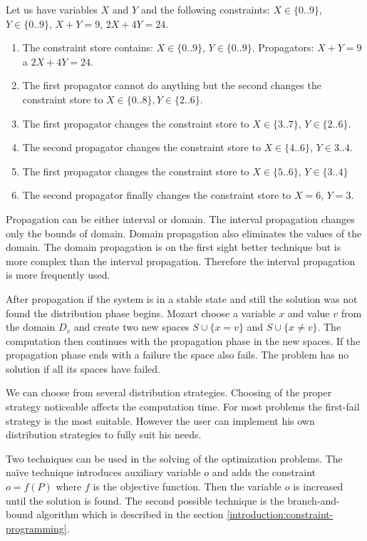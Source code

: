 \begin{example} Let us have variables $X$ and $Y$ and the following constraints: $X \in \{0..9\}$, $Y \in \{0..9\}$, 
  $X+Y = 9$, $2X + 4Y = 24$. 
\begin{enumerate}
  \item The constraint store contains: $X \in \{0..9\}$, $Y \in \{0..9\}$. Propagators: $X+Y = 9$ a $2X + 4Y = 24$.
  \item	The first propagator cannot do anything but the second changes the constraint store to $X \in \{0..8\}, Y \in \{2..6\}$.
  \item	The first propagator changes the constraint store to $X \in \{3..7\}$, $Y \in \{2..6\}$.
  \item	The second propagator changes the constraint store to $X \in \{4..6\}$, $Y \in 3..4$.
  \item	The first propagator changes the constraint store to $X \in \{5..6\}$, $Y \in \{3..4\}$
  \item	The second propagator finally changes the constraint store to $X = 6$, $Y = 3$.
\end{enumerate}
\end{example}

Propagation can be either interval or domain. The interval propagation changes only 
the bounds of domain. Domain propagation also eliminates the values of the domain.
The domain propagation is on the first sight better technique but is more complex
than the interval propagation. Therefore the interval propagation is more frequently used.

After propagation if the system is in a stable state and still the solution was not found
the distribution phase begins. Mozart choose a variable $x$ and value $v$ from the domain
 $D_v$ and create two new spaces $S \cup \{x = v\}$ and $S \cup \{x \neq v\}$.
 The computation then continues with the propagation phase in the new spaces.
 If the propagation phase ends with a failure the space also fails. The problem has no
 solution if all its spaces have failed.

We can choose from several distribution strategies. Choosing of the proper strategy 
noticeable affects the computation time.  For most problems the first-fail strategy is
the most suitable. However the user can implement his own distribution strategies to fully
suit his needs.

Two techniques can be used in the solving of the optimization problems. The na\"{i}ve 
technique introduces auxiliary variable $o$ and adds the constraint $o = f(P)$ where $f$ is the
objective function. Then the variable $o$ is increased until the solution is found. The second possible
technique is the branch-and-bound algorithm which is described in the section \ref{introduction:constraint-programming}.

